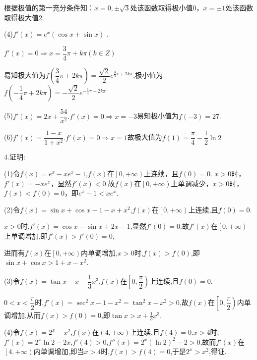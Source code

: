 根据极值的第一充分条件知：$x = 0, \pm \sqrt 3 $处该函数取得极小值0，$x =  \pm 1$处该函数取得极大值2.

(4)$f'\left( x \right) = {e^x}\left( {\cos x + \sin x} \right)$ .

$f'\left( x \right) = 0 \Rightarrow x = \dfrac{3}{4}\pi  + k\pi \left( {k \in Z} \right)$

易知极大值为$f\left( {\dfrac{3}{4}\pi  + 2k\pi } \right) = \dfrac{{\sqrt 2 }}{2}{e^{\frac{3}{4}\pi  + 2k\pi }}$,极小值为$f\left( { - \dfrac{1}{4}\pi  + 2k\pi } \right) =  - \dfrac{{\sqrt 2 }}{2}{e^{ - \frac{1}{4}\pi  + 2k\pi }}$

(5)$f'\left( x \right) = 2x + \dfrac{{54}}{{{x^2}}}.f'\left( x \right) = 0 \Rightarrow x =  - 3$易知极小值为$f\left( { - 3} \right) = 27$.

(6)$f'\left( x \right) = \dfrac{{1 - x}}{{1 + {x^2}}}.f'\left( x \right) = 0 \Rightarrow x = 1$故极大值为$f\left( 1 \right) = \dfrac{\pi }{4} - \dfrac{1}{2}\ln 2$

4.证明:

(1)令$f\left( x \right) = {e^x} - x{e^x} - 1$,$f\left( x \right)$在$\left[ {0, + \infty } \right)$上连续，且$f\left( 0 \right) = 0$.
$x > 0$时，$f'\left( x \right) =  - x{e^x}$，显然$f'\left( x \right) < 0$.故$f\left( x \right)$在$\left[ {0, + \infty } \right)$上单调减少，$x > 0$时，$f\left( x \right) < f\left( 0 \right) = 0$，即${e^x} - 1 < x{e^x}$.

(2)令$f\left( x \right) = \sin x + \cos x - 1 - x + {x^2}$,$f\left( x \right)$在$\left[ {0, + \infty } \right)$上连续,且$f\left( 0 \right) = 0$.

$x > 0$时,$f'\left( x \right) = \cos x - \sin x + 2x - 1$,显然$f'\left( 0 \right) = 0$.故$f'\left( x \right)$在$\left[ {0, + \infty } \right)$上单调增加,即$f'\left( x \right) > f'\left( 0 \right) = 0$,

进而有$f\left( x \right)$在$\left[ {0, + \infty } \right)$内单调增加,$x > 0$时,$f\left( x \right) > f\left( 0 \right)$,即$\sin x + \cos x > 1 + x - {x^2}$.

(3)令$f\left( x \right) = \tan x - x - \dfrac{1}{3}{x^3}$,$f(x)$在$\left[ {0,\dfrac{\pi }{2}} \right)$上连续,且$f\left( 0 \right) = 0$.

$0 < x < \dfrac{\pi }{2}$时,$f'\left( x \right) = {\sec ^2}x - 1 - {x^2} = {\tan ^2}x - {x^2} > 0$,故$f(x)$在$\left[ {0,\dfrac{\pi }{2}} \right)$内单调增加,从而$f\left( x \right) > f\left( 0 \right) = 0$,即$\tan x > x + \frac{1}{3}{x^3}$.

(4)令$f\left( x \right) = {2^x} - {x^2}$,$f(x)$在$\left( {4, + \infty } \right)$上连续,且$f\left( 4 \right) = 0$.$x > 4$时,$f'\left( x \right) = {2^x}\ln 2 - 2x$,$f'\left( 4 \right) > 0$,$f''\left( x \right) = {2^x}{\left( {\ln 2} \right)^2} - 2 > 0$,故而$f'\left( x \right)$在$\left[ {4, + \infty } \right)$内单调增加,即当$x > 4$时,$f\left( x \right) > f\left( 4 \right) = 0$,于是${2^x} > {x^2}$,得证.

